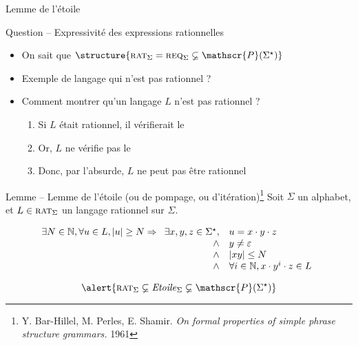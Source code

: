 
\begingroup

\begin{frame}{Lemme de l'étoile}

  \vspace{-2mm}
  \begin{block}{Question -- Expressivité des expressions rationnelles}
    \vspace{-2mm}
    \begin{itemize}
    \item On sait que $\structure{\textsc{rat}_\Sigma = \textsc{req}_\Sigma \varsubsetneq \mathscr{P}(\Sigma^\star)}$
    \item Exemple de langage qui n'est pas rationnel ? 
    \item Comment montrer qu'un langage $L$ n'est pas rationnel ? 
      \begin{enumerate}
      \item Si $L$ était rationnel, il vérifierait le  
      \item Or, $L$ ne vérifie pas le  
      \item Donc, par l'absurde, $L$ ne peut pas être rationnel
      \end{enumerate}
    \end{itemize}
  \end{block}

  \vspace{-2mm}
  \begin{alertblock}{Lemme -- Lemme de l'étoile (ou de pompage, ou d'itération)\footnote[frame, 1]{\scriptsize Y. Bar-Hillel, M. Perles, E. Shamir. \textit{On formal properties of simple phrase structure grammars.} 1961}}
    \vspace{-1mm}
    Soit $\Sigma$ un alphabet, et $L\in \textsc{rat}_\Sigma$ un langage rationnel sur $\Sigma$.

    \vspace{-5mm}
    $$
    \begin{array}{c}
      \exists N\in \mathbb{N}, \forall u\in L, |u| \ge N \Rightarrow
      \begin{array}[t]{rl}
        \exists x, y, z\in \Sigma^\star, &u = x\cdot y \cdot z \\
        \land& y\neq \varepsilon \\
        \land& |xy| \le N\\
        \land& \forall i \in \mathbb{N}, x\cdot y^i \cdot z \in L
      \end{array}
    \end{array}
    $$

    \vspace{-2mm}
    $$\alert{\textsc{rat}_\Sigma \varsubsetneq \mathit{Etoile}_\Sigma \varsubsetneq \mathscr{P}(\Sigma^\star)}$$
  \end{alertblock}
\end{frame}


\endgroup
